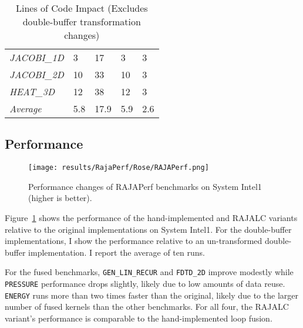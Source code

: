 \begin{table}[t]
\begin{tabular}{|l|l|l|l|l|}
\textit{JACOBI\_1D}      & 3                                               & 17                                           & 3                                              & 3                                            \\
\textit{JACOBI\_2D}      & 10                                              & 33                                           & 10                                             & 3                                            
\\
\textit{HEAT\_3D}        & 12                                              & 38                                           & 12                                             & 3                                            \\ \hline
\textit{Average}        & 5.8                                              & 17.9                                           & 5.9                                            & 2.6                                            \\ \hline
\end{tabular}
\caption{Lines of Code Impact (Excludes double-buffer transformation changes)}\label{sloc}
\end{table}

\subsection{Performance}
\begin{figure}
\texttt{[image: results/RajaPerf/Rose/RAJAPerf.png]}
\caption{Performance changes of RAJAPerf benchmarks on System Intel1 (higher is better).}\label{RAJAPerfPerf}
\end{figure}
Figure~\ref{RAJAPerfPerf} shows the performance of the hand-implemented
and RAJALC variants relative to the original implementations on System Intel1. 
For the double-buffer implementations, I show the performance relative to an 
un-transformed double-buffer implementation. 
I report the average of ten runs. 

For the fused benchmarks, \verb.GEN_LIN_RECUR. and \verb.FDTD_2D. improve
modestly while \verb.PRESSURE. performance drops slightly, likely due to low amounts of data reuse. 
\verb.ENERGY. runs more than two times faster than the original, likely due
to the larger number of fused kernels than the other benchmarks. 
For all four, the RAJALC variant's performance is comparable to the
hand-implemented loop fusion. 
 

